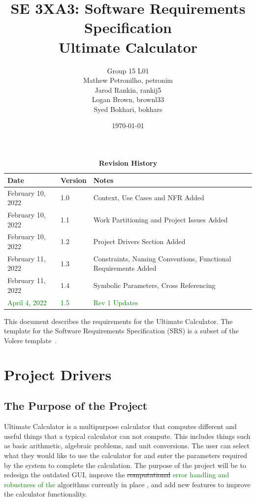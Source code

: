 \documentclass[12pt, titlepage]{article}
\title{SE 3XA3: Software Requirements Specification\\Ultimate Calculator}
\author{Group 15 L01
    \\ Mathew Petronilho, petronim
    \\ Jarod Rankin, rankij5
    \\ Logan Brown, brownl33
    \\ Syed Bokhari, bokhars
}
\date{\today}
\begin{document}
\maketitle

\tableofcontents
\listoftables
\listoffigures

\begin{table}[H]
\caption{\bf Revision History}
\begin{tabularx}{\textwidth}{p{3cm}p{2cm}X}
\toprule {\bf Date} & {\bf Version} & {\bf Notes}\\
\midrule
February 10, 2022 & 1.0 & Context, Use Cases and NFR Added\\
February 10, 2022 & 1.1 & Work Partitioning and Project Issues Added\\
February 10, 2022 & 1.2 & Project Drivers Section Added\\
February 11, 2022 & 1.3 & Constraints, Naming Conventions, Functional Requirements Added\\
February 11, 2022 & 1.4 & Symbolic Parameters, Cross Referencing\\
\textcolor{Green}{April 4, 2022} & \textcolor{Green}{1.5} & \textcolor{Green}{Rev 1 Updates}\\
\bottomrule
\end{tabularx}
\end{table}

\newpage


This document describes the requirements for the Ultimate Calculator. The template for the Software
Requirements Specification (SRS) is a subset of the Volere
template~\citep{RobertsonAndRobertson2012}.

\section{Project Drivers}

\subsection{The Purpose of the Project}
Ultimate Calculator is a multipurpose calculator that computes different and useful things that a typical calculator can not compute. This includes things such as basic arithmetic, algebraic problems, and unit conversions. The user can select what they would like to use the calculator for and enter the parameters required by the system to complete the calculation. The purpose of the project will be to redesign the outdated GUI, improve the \sout{computational} \textcolor{Green}{error handling and robustness of the} algorithms currently in place , and add new features to improve the calculator functionality.
\end{document}
